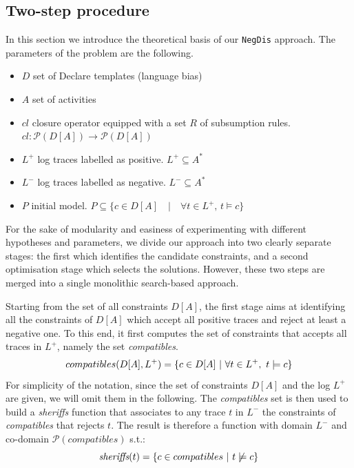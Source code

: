 \documentclass[a4wide,11pt]{article}
\theoremstyle{definition}
\theoremstyle{plain}
\newcommand{\nd}{\texttt{NegDis}\xspace}
\newcommand{\sheriff}{sheriffs}
\begin{document}
\subsection{Two-step procedure}

In this section we introduce the theoretical basis of our \nd approach. The parameters of the problem are the following.
\begin{itemize}
  \item $D$ set of Declare templates (language bias)
  \item $A$ set of activities
  \item $cl$ closure operator equipped with a set $R$ of subsumption rules. $cl: \mathcal{P}(D[A])\rightarrow\mathcal{P}(D[A])$
  \item $L^+$ log traces labelled as positive. $L^+ \subseteq A^*$
  \item $L^-$ log traces labelled as negative. $L^- \subseteq A^*$
  \item $P$ initial model. $P\subseteq \{c\in D[A]\quad | \quad \forall t\in L^+,\, t\models c\}$
\end{itemize}

For the sake of modularity and easiness of experimenting with different hypotheses and parameters, we divide our approach into two clearly separate stages: the first which identifies the candidate constraints, and a second optimisation stage which selects the solutions. However, these two steps are merged into a single monolithic search-based approach. 

Starting from the set of all constraints $D[A]$, the first stage aims at identifying all the constraints of $D[A]$ which accept all positive traces and reject at least a negative one. To this end, it first computes the set of constraints that accepts all traces in $L^+$, namely the set \emph{compatibles}. 
\begin{equation}
{compatibles(D[A], L^+)} = \{c\in D[A]~|~\forall t\in L^+,~ t\models c \} \\
\end{equation}
%
For simplicity of the notation, since the set of constraints $D[A]$ and the log $L^+$ are given, we will omit them in the following.
%
The \emph{compatibles} set is then used to build a \textit{\sheriff} function that associates to any trace $t$ in $L^-$ the constraints of \textit{compatibles} that rejects $t$.
The result is therefore a function with domain $L^-$ and co-domain $\mathcal{P}({compatibles})$ s.t.:
\begin{equation}
{\textit{\sheriff}}(t) = \{c\in {compatibles}~|~t\not\models c\} \\
\end{equation}
\end{document}
